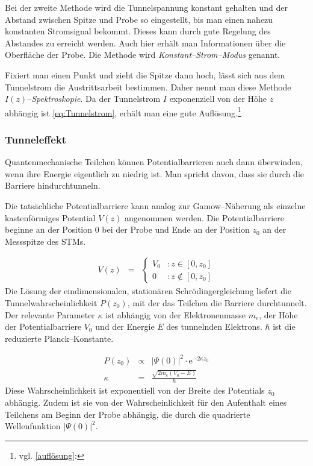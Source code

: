 \documentclass[12pt,a4paper]{scrartcl}
\numberwithin{equation}{section} %
\begin{document}
Bei der zweite Methode wird die Tunnelspannung konstant gehalten und der Abstand zwischen Spitze und Probe so eingestellt, bis man einen nahezu konstanten Stromsignal bekommt. Dieses kann durch gute Regelung des Abstandes zu erreicht werden. Auch hier erhält man Informationen über die Oberfläche der Probe. Die Methode wird \textit{Konstant--Strom--Modus} genannt.

Fixiert man einen Punkt und zieht die Spitze dann hoch, lässt sich aus dem Tunnelstrom die Austrittsarbeit bestimmen. Daher nennt man diese Methode $I(z)$--\textit{Spektroskopie}. Da der Tunnelstrom $I$ exponenziell von der Höhe $z$ abhängig ist \eqref{eq:Tunnelstrom}, erhält man eine gute Auflösung.\footnote{vgl. \ref{auflösung}: }

\hypertarget{tunneleffekt}{%
\subsubsection{Tunneleffekt}\label{tunneleffekt}}
Quantenmechanische Teilchen können Potentialbarrieren auch dann überwinden, wenn ihre Energie eigentlich zu niedrig ist. Man spricht davon, dass sie durch die Barriere hindurchtunneln.

Die tatsächliche Potentialbarriere kann analog zur Gamow--Näherung als einzelne kastenförmiges Potential $V(z)$ angenommen werden. Die Potentialbarriere beginne an der Position $0$ bei der Probe und Ende an der Position $z_0$ an der Messspitze des STMs.

\begin{eqnarray}
    V(z) &=&
        \begin{cases}
            V_0 &: z \in [0, z_0] \\
            0 &: z \notin [0, z_0]
        \end{cases}
\end{eqnarray}
Die Lösung der eindimensionalen, stationären Schrödingergleichung liefert die Tunnelwahrscheinlichkeit $P(z_0)$, mit der das Teilchen die Barriere durchtunnelt. Der relevante Parameter $\kappa$ ist abhängig von der Elektronenmasse $m_e$, der Höhe der Potentialbarriere $V_0$ und der Energie $E$ des tunnelnden Elektrons. $\hbar$ ist die reduzierte Planck--Konstante.

\begin{eqnarray}
    P(z_0) &\propto& |\Psi(0)|^2 \cdot \mathrm e^{-2\kappa z_0} \\
    \kappa &=& \frac{\sqrt{2m_e(V_0 - E)}}{\hbar} \label{eq:Tunnelwkt Kappa}
\end{eqnarray}
Diese Wahrscheinlichkeit ist exponentiell von der Breite des Potentials $z_0$ abhängig. Zudem ist sie von der Wahrscheinlichkeit für den Aufenthalt eines Teilchens am Beginn der Probe abhängig, die durch die quadrierte Wellenfunktion $|\Psi(0)|^2$.
\end{document}
